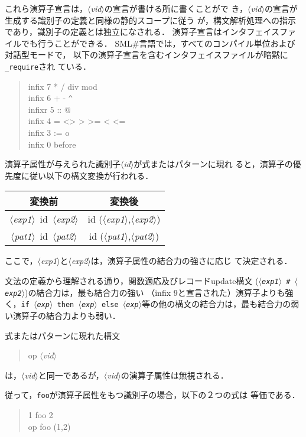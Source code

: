 \documentclass{jbook}
\newcommand{\smlsharp}{SML\#}
\newcommand{\code}[1]{\mbox{\large\tt #1}}
\newcommand{\nonterm}[1]{\mbox{$\langle$}{\it #1}\mbox{$\rangle$}}
\newenvironment{program}{\begin{quote}\begin{tt}}%
                        {\end{tt}\end{quote}}
\begin{document}
	これら演算子宣言は，\nonterm{vid}の宣言が書ける所に書くことがで
き，\nonterm{vid}の宣言が生成する識別子の定義と同様の静的スコープに従う
が，構文解析処理への指示であり，識別子の定義とは独立になされる．
	演算子宣言はインタフェイスファイルでも行うことができる．
	\smlsharp{}言語では，すべてのコンパイル単位および対話型モードで，
以下の演算子宣言を含むインタフェイスファイルが暗黙に\code{\_require}され
ている．
\begin{program}
  infix  7 * / div mod\\
  infix  6 + - \verb|^|\\
  infixr 5 :: @\\
  infix  4 = <> > >= < <=\\
  infix  3 := o\\
  infix  0 before
\end{program}
	
	演算子属性が与えられた識別子\nonterm{id}が式またはパターンに現れ
ると，演算子の優先度に従い以下の構文変換が行われる．

\begin{tabular}{|c|c|}
\hline
変換前 & 変換後
\\\hline
\nonterm{exp1}\ id\ \nonterm{exp2} & id (\nonterm{exp1},\nonterm{exp2})
\\\hline
\nonterm{pat1}\ id\ \nonterm{pat2} & id (\nonterm{pat1},\nonterm{pat2})	
\\\hline
\end{tabular}

ここで，\nonterm{exp1}と\nonterm{exp2}は，演算子属性の結合力の強さに応じ
て決定される．

	文法の定義から理解される通り，関数適応及びレコードupdate構文
(\code{\nonterm{exp1}\ \#\ \nonterm{exp2}})の結合力は，最も結合力の強い
（infix 9と宣言された）演算子よりも強く，\code{if \nonterm{exp}\ then
\nonterm{exp}\ else \nonterm{exp}}等の他の構文の結合力は，最も結合力の弱
い演算子の結合力よりも弱い．

	式またはパターンに現れた構文
\begin{program}
op \nonterm{vid}
\end{program}
は，\nonterm{vid}と同一であるが，\nonterm{vid}の演算子属性は無視される．

	従って，\code{foo}が演算子属性をもつ識別子の場合，以下の２つの式は
等価である．
\begin{program}
1 foo 2\\
op foo (1,2)
\end{program}

\else%
\end{document}
